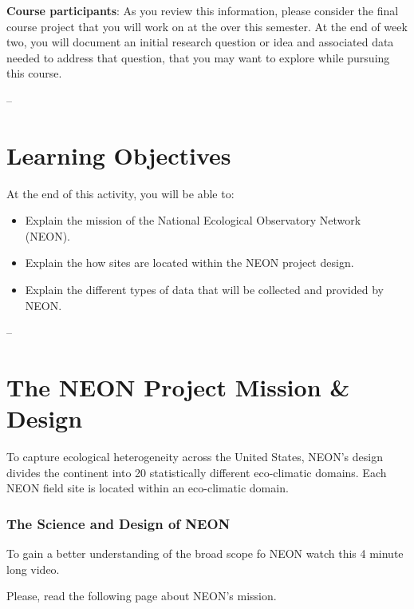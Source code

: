 \documentclass[]{book}
\providecommand{\tightlist}{%
  \setlength{\itemsep}{0pt}\setlength{\parskip}{0pt}}
\begin{document}
\leavevmode\hypertarget{ds-challenge}{}%
\textbf{Course participants}: As you review this information, please
consider the
final course project
that you will work on at the over this semester. At the end of week two, you will
document an initial research question or idea and associated data needed to
address that question, that you may want to explore while pursuing this course.

\leavevmode\hypertarget{ds-objectives}{}%
--

\hypertarget{learning-objectives}{%
\section{Learning Objectives}\label{learning-objectives}}

At the end of this activity, you will be able to:

\begin{itemize}
\tightlist
\item
  Explain the mission of the National Ecological Observatory Network (NEON).
\item
  Explain the how sites are located within the NEON project design.
\item
  Explain the different types of data that will be collected and provided by
  NEON.
\end{itemize}

--

\hypertarget{the-neon-project-mission-design}{%
\section{The NEON Project Mission \& Design}\label{the-neon-project-mission-design}}

To capture ecological heterogeneity across the United States, NEON's design
divides the continent into 20 statistically different eco-climatic domains. Each
NEON field site is located within an eco-climatic domain.

\hypertarget{the-science-and-design-of-neon}{%
\subsubsection{The Science and Design of NEON}\label{the-science-and-design-of-neon}}

To gain a better understanding of the broad scope fo NEON watch this 4 minute long
video.

Please, read the following page about
 NEON's mission.
\end{document}
